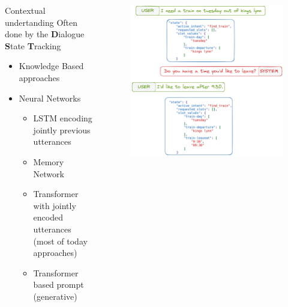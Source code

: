 \documentclass[10pt,aspectratio=169]{beamer}
\begin{document}
\begin{frame}
       \begin{columns}
        \begin{column}{0.6\textwidth}
    \begin{block}{Contextual undertanding}
        Often done by the \textbf{D}ialogue \textbf{S}tate \textbf{T}racking

        \begin{itemize}
            \item Knowledge Based approaches  \cite{llanos-etal-2016-managing}

            \item Neural Networks
            \begin{itemize}
                \item LSTM encoding jointly previous utterances \cite{Hori2015ContextSS}
                \item Memory Network \cite{chen2016end-to-end}
                \item Transformer with jointly encoded utterances (most of today approaches) \cite{gao-2019-bert}
                \item Transformer based prompt (generative) \cite{lee-etal-2021-dialogue}
            \end{itemize}
        \end{itemize}
    \end{block}
        \end{column}
        \begin{column}{0.4\textwidth}
            \begin{figure}
                \centering
                \includegraphics[width=1.\textwidth]{media/update_dst.png}


\end{figure}
\end{column}
\end{columns}
\end{frame}
\end{document}
